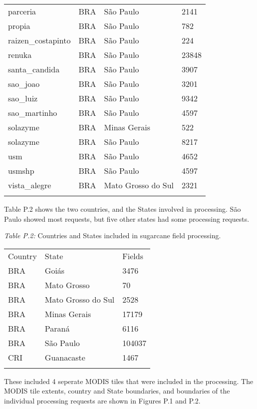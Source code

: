\documentclass[]{article}
\begin{document}
\begin{longtable}[c]{@{}llll@{}}
\\\addlinespace
parceria & BRA & São Paulo & 2141
\\\addlinespace
propia & BRA & São Paulo & 782
\\\addlinespace
raizen\_costapinto & BRA & São Paulo & 224
\\\addlinespace
renuka & BRA & São Paulo & 23848
\\\addlinespace
santa\_candida & BRA & São Paulo & 3907
\\\addlinespace
sao\_joao & BRA & São Paulo & 3201
\\\addlinespace
sao\_luiz & BRA & São Paulo & 9342
\\\addlinespace
sao\_martinho & BRA & São Paulo & 4597
\\\addlinespace
solazyme & BRA & Minas Gerais & 522
\\\addlinespace
solazyme & BRA & São Paulo & 8217
\\\addlinespace
usm & BRA & São Paulo & 4652
\\\addlinespace
usmshp & BRA & São Paulo & 4597
\\\addlinespace
vista\_alegre & BRA & Mato Grosso do Sul & 2321
\\\addlinespace
\bottomrule
\end{longtable}

Table P.2 shows the two countries, and the States involved in
processing. São Paulo showed most requests, but five other states had
some processing requests.

\emph{Table P.2:} Countries and States included in sugarcane field
processing.

\begin{longtable}[c]{@{}lll@{}}
\toprule\addlinespace
Country & State & Fields
\\\addlinespace
\midrule\endhead
BRA & Goiás & 3476
\\\addlinespace
BRA & Mato Grosso & 70
\\\addlinespace
BRA & Mato Grosso do Sul & 2528
\\\addlinespace
BRA & Minas Gerais & 17179
\\\addlinespace
BRA & Paraná & 6116
\\\addlinespace
BRA & São Paulo & 104037
\\\addlinespace
CRI & Guanacaste & 1467
\\\addlinespace
\bottomrule
\end{longtable}

These included 4 seperate MODIS tiles that were included in the
processing. The MODIS tile extents, country and State boundaries, and
boundaries of the individual processing requests are shown in Figures
P.1 and P.2.
\end{document}
